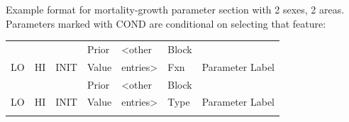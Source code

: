 Example format for mortality-growth parameter section with 2 sexes, 2 areas.
Parameters marked with COND are conditional on selecting that feature:
\begin{longtable}{p{1.1cm} p{1.1cm} p{1.1cm} p{1.1cm} p{1.5cm} p{1.1cm} p{6.75cm}}
	\hline
	   &	&	   & Prior & <other & Block & \Tstrut\\
	LO & HI & INIT & Value & entries> & Fxn & Parameter Label \Bstrut\\
	\hline
	\endfirsthead

	\hline
	   &	&	   & Prior & <other & Block & \Tstrut\\
	LO & HI & INIT & Value & entries> & Type & Parameter Label \Bstrut\\
	\hline
	\endhead

	\hline
	\endfoot

	\endlastfoot


\end{longtable}
